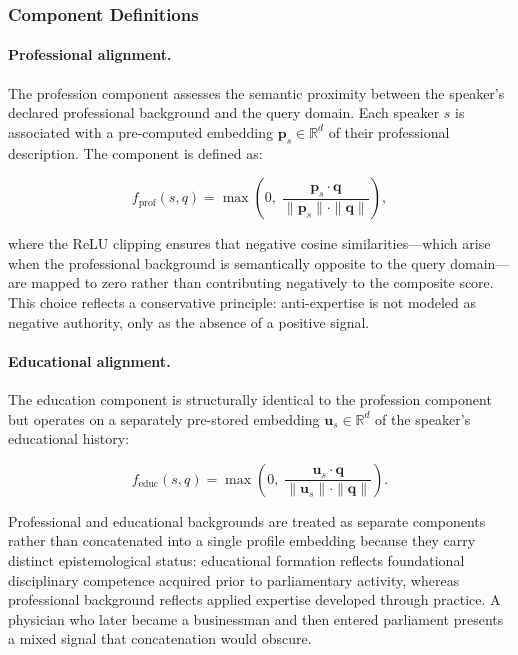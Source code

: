 \subsubsection{Component Definitions}

\paragraph{Professional alignment.}
The profession component assesses the semantic proximity between the speaker's declared
professional background and the query domain. Each speaker $s$ is associated with a
pre-computed embedding $\mathbf{p}_s \in \mathbb{R}^d$ of their professional description.
The component is defined as:

\begin{equation}
    f_\text{prof}(s, q) = \max\!\left(0,\; \frac{\mathbf{p}_s \cdot \mathbf{q}}{\|\mathbf{p}_s\| \cdot \|\mathbf{q}\|}\right),
\end{equation}

where the ReLU clipping ensures that negative cosine similarities---which arise when the
professional background is semantically opposite to the query domain---are mapped to zero
rather than contributing negatively to the composite score. This choice reflects a conservative
principle: anti-expertise is not modeled as negative authority, only as the absence of a
positive signal.

\paragraph{Educational alignment.}
The education component is structurally identical to the profession component but operates on
a separately pre-stored embedding $\mathbf{u}_s \in \mathbb{R}^d$ of the speaker's educational
history:

\begin{equation}
    f_\text{educ}(s, q) = \max\!\left(0,\; \frac{\mathbf{u}_s \cdot \mathbf{q}}{\|\mathbf{u}_s\| \cdot \|\mathbf{q}\|}\right).
\end{equation}

Professional and educational backgrounds are treated as separate components rather than
concatenated into a single profile embedding because they carry distinct epistemological status:
educational formation reflects foundational disciplinary competence acquired prior to
parliamentary activity, whereas professional background reflects applied expertise developed
through practice. A physician who later became a businessman and then entered parliament
presents a mixed signal that concatenation would obscure.


